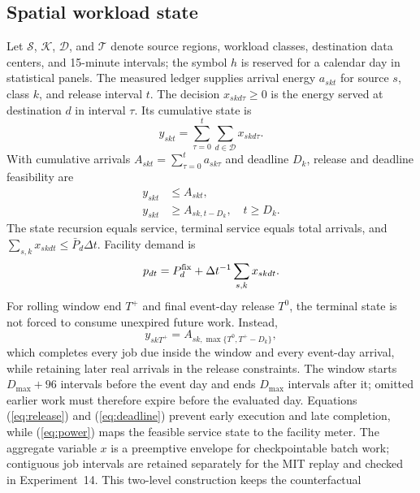 \documentclass[10pt,journal]{IEEEtran}
\newcommand{\dt}{\Delta t}
\begin{document}
\subsection{Spatial workload state}

Let $\mathcal S$, $\mathcal K$, $\mathcal D$, and $\mathcal T$ denote source
regions, workload classes, destination data centers, and 15-minute intervals;
the symbol $h$ is reserved for a calendar day in statistical panels.
The measured ledger supplies arrival energy $a_{skt}$ for source $s$, class
$k$, and release interval $t$. The decision $x_{skd\tau}\geq0$ is the energy
served at destination $d$ in interval $\tau$. Its cumulative state is
\begin{equation}
 y_{skt}=\sum_{\tau=0}^{t}\sum_{d\in\mathcal D}x_{skd\tau}.
 \label{eq:cumulative}
\end{equation}
With cumulative arrivals $A_{skt}=\sum_{\tau=0}^{t}a_{sk\tau}$ and deadline
$D_k$, release and deadline feasibility are
\begin{align}
 y_{skt}&\leq A_{skt}, \label{eq:release}\\
 y_{skt}&\geq A_{sk,t-D_k},\quad t\geq D_k. \label{eq:deadline}
\end{align}
The state recursion equals service, terminal service equals total arrivals, and
$\sum_{s,k}x_{skdt}\leq\bar P_d\dt$. Facility demand is
\begin{equation}
 p_{dt}=P_d^{\rm fix}+\dt^{-1}\sum_{s,k}x_{skdt}.
 \label{eq:power}
\end{equation}
For rolling window end $T^+$ and final event-day release $T^0$, the terminal
state is not forced to consume unexpired future work. Instead,
\begin{equation}
y_{skT^+}=A_{sk,\max\{T^0,T^+-D_k\}},
\label{eq:rollingterminal}
\end{equation}
which completes every job due inside the window and every event-day arrival,
while retaining later real arrivals in the release constraints. The window
starts $D_{\max}+96$ intervals before the event day and ends $D_{\max}$
intervals after it; omitted earlier work must therefore expire before the
evaluated day.
Equations (\ref{eq:release}) and (\ref{eq:deadline}) prevent early execution
and late completion, while (\ref{eq:power}) maps the feasible service state to
the facility meter.
The aggregate variable \(x\) is a preemptive envelope for checkpointable batch
work; contiguous job intervals are retained separately for the MIT replay and
checked in Experiment~14. This two-level construction keeps the counterfactual
\end{document}
